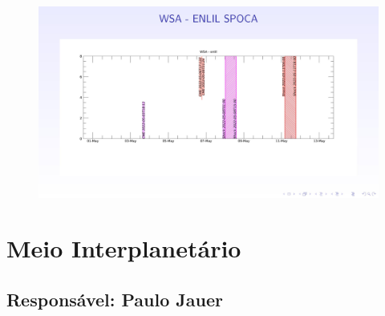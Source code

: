 \documentclass[a4paper, 10pt]{article}
\begin{document}
    
    \begin{figure}[H]
        \centering
        \includegraphics[width=14cm]{./figures/pt_outfileSun_1.jpg}
    \end{figure} 
 

    \section{Meio Interplanetário} 
 \subsection{Responsável: Paulo Jauer} 
 
\end{document}
